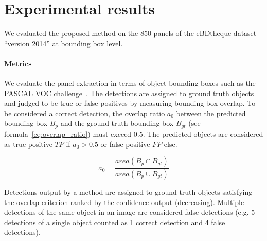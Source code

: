 

\section{Experimental results}
\label{sec:pe:experimental_results}
We evaluated the proposed method on the 850 panels of the eBDtheque dataset~\cite{Guerin2013} ``version 2014'' at bounding box level.


\paragraph{Metrics} %
\label{par:metrics}

We evaluate the panel extraction in terms of object bounding boxes such as the PASCAL VOC challenge~\cite{everingham2010pascal}.
The detections are assigned to ground truth objects and judged to be true or false positives by measuring bounding box overlap. To be considered a correct detection, the overlap ratio $a_0$ between the predicted bounding box $B_p$ and the ground truth bounding box $B_{gt}$ (see formula~\ref{eq:overlap_ratio}) must exceed 0.5.
The predicted objects are considered as true positive $TP$ if $a_0 > 0.5$ or false positive $FP$ else.

\begin{equation}
\label{eq:overlap_ratio}
  a_0 = \frac{area(B_p \cap B_{gt})}{area(B_p \cup B_{gt})}
\end{equation}

Detections output by a method are assigned to ground truth objects satisfying the overlap criterion ranked by the confidence output (decreasing).
Multiple detections of the same object in an image are considered false detections (e.g. 5 detections of a single object counted as 1 correct detection and 4 false detections).

